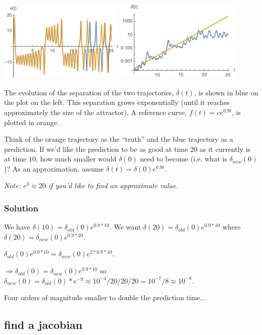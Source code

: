 \documentclass[12pt,letterpaper,noanswers]{exam}
\begin{document}
\includegraphics[width=0.45\textwidth]{img/C24-2019-11-01p1.png}\hfill
\includegraphics[width=0.45\textwidth]{img/C24-2019-11-01p2.png}

The evolution of the separation of the two trajectories, $\delta(t)$, is shown in blue on the plot on the left.  This separation grows exponentially (until it reaches approximately the size of the attractor).  A reference curve, $f(t) = ce^{0.9t}$, is plotted in orange. 


Think of the orange trajectory as the ``truth'' and the blue trajectory as a prediction.  If we'd like the prediction to be as good at time $20$ as it currently is at time $10$, how much smaller would $\delta(0)$ need to become (i.e. what is $\delta_{new}(0)$)?  As an approximation, assume $\delta(t) =\delta(0) e^{0.9t}$.

\emph{Note: $e^3\approx 20$ if you'd like to find an approximate value.}


\subsubsection{Solution}
We have $\delta(10) = \delta_{old}(0) e^{0.9*10}$.  We want $\delta(20) = \delta_{old}(0)e^{0.9*10}$ where $\delta(20) = \delta_{new}(0)e^{0.9*20}$.

$\delta_{old}(0) e^{0.9*10} = \delta_{new}(0)e^{2*0.9*10}$.

$\Rightarrow \delta_{old}(0) = \delta_{new}(0)e^{0.9*10}$ so $\delta_{new}(0) = \delta_{old}(0)*e^{-9}\approx 10^{-4}/20/20/20 = 10^{-7}/8\approx 10^{-8}$.

Four orders of magnitude smaller to double the prediction time...

\subsection{find a jacobian}
\end{document}
